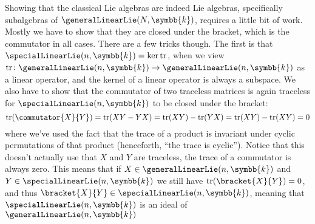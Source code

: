 \documentclass[fleqn]{NotesClass}
\renewcommand{\field}{\symbb{k}}
\DeclareMathOperator{\tr}{tr}
\begin{document}
    Showing that the classical Lie algebras are indeed Lie algebras, specifically subalgebras of \(\generalLinearLie(N, \field)\), requires a little bit of work.
    Mostly we have to show that they are closed under the bracket, which is the commutator in all cases.
    There are a few tricks though.
    The first is that \(\specialLinearLie(n, \field) = \ker \tr\), when we view \(\tr \colon \generalLinearLie(n, \field) \to \generalLinearLie(n, \field)\) as a linear operator, and the kernel of a linear operator is always a subspace.
    We also have to show that the commutator of two traceless matrices is again traceless for \(\specialLinearLie(n, \field)\) to be closed under the bracket:
    \begin{equation}
        \tr(\commutator{X}{Y}) = \tr(XY - YX) = \tr(XY) - \tr(YX) = \tr(XY) - \tr(XY) = 0
    \end{equation}
    where we've used the fact that the trace of a product is invariant under cyclic permutations of that product (henceforth, \enquote{the trace is cyclic}).
    Notice that this doesn't actually use that \(X\) and \(Y\) are traceless, the trace of a commutator is always zero.
    This means that if \(X \in \generalLinearLie(n, \field)\) and \(Y \in \specialLinearLie(n, \field)\) we still have \(\tr(\bracket{X}{Y}) = 0\), and thus \(\bracket{X}{Y} \in \specialLinearLie(n, \field)\), meaning that \(\specialLinearLie(n, \field)\) is an ideal of \(\generalLinearLie(n, \field)\)
    
\end{document}
